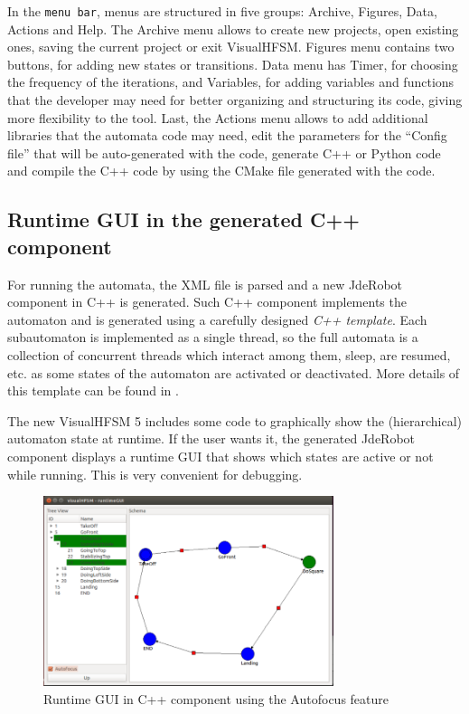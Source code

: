 \documentclass[journal,twoside]{JoPhA}
\begin{document}
In the \texttt{menu bar}, menus are structured in five groups: Archive, Figures, Data, Actions and Help. The Archive menu allows to create new projects, open existing ones, saving the current project or exit VisualHFSM. Figures menu contains two buttons, for adding new states or transitions. Data menu has Timer, for choosing the frequency of the iterations, and Variables, for adding variables and functions that the developer may need for better organizing and structuring its code, giving more flexibility to the tool. Last, the Actions menu allows to add additional libraries that the automata code may need, edit the parameters for the “Config file” that will be auto-generated with the code, generate C++ or Python code and compile the C++ code by using the CMake file generated with the code.

\subsection{Runtime GUI in the generated C++ component}

For running the automata, the XML file is parsed and a new JdeRobot component in C++ is generated. Such C++ component implements the automaton and is generated using a carefully designed \textit{C++ template}. Each subautomaton is implemented as a single thread, so the full automata is a collection of concurrent threads which interact among them, sleep, are resumed, etc. as some states of the automaton are activated or deactivated. More details of this template can be found in \cite{borja2013}.

The new VisualHFSM 5 includes some code to graphically show the (hierarchical) automaton state at runtime. If the user wants it, the generated JdeRobot component displays a runtime GUI that shows which states are active or not while running. This is very convenient for debugging. %

\begin{figure}[ht!]
\begin{center}
        \includegraphics[width=8.5cm]{figs/runtime.png}
\end{center}
\caption{Runtime GUI in C++ component using the Autofocus feature}
\label{fig:runtime}
\end{figure}
\end{document}
